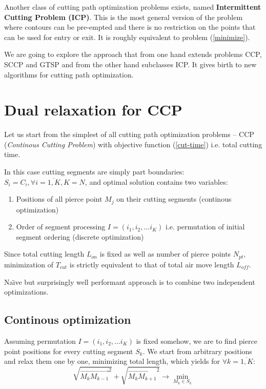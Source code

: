\documentclass{../download/tPRS2e}
\begin{document}
Another class of cutting path optimization problems exists,
named \textbf{Intermittent Cutting Problem (ICP)}.
This is the most general version of the problem
where contours can be pre-empted and there is
no restriction on the points that can be used for entry or exit.
It is roughly equivalent to problem (\ref{minimize}).

We are going to explore the approach
that from one hand
extends problems CCP, SCCP and GTSP
and from the other hand
subclasses ICP.
It gives birth to new algorithms for
cutting path optimization.

\hrulefill

\section{Dual relaxation for CCP}

Let us start from the simplest
of all cutting path optimization problems --
CCP (\textit{Continous Cutting Problem})
with objective function (\ref{cut-time})
i.e. total cutting time. 

In this case
cutting segments are simply part boundaries:
$S_i = C_i, \forall i = \overline{1,K}, K=N$,
and optimal solution contains two variables:
\begin{enumerate}
    \item{Positions of all pierce point $M_j$ on their cutting segments} (continous optimization)
    \item{Order of segment processing $I = (i_1, i_2, \dots i_K)$ i.e. permutation of initial segment ordering} (discrete optimization)
\end{enumerate}
Since total cutting length $L_{on}$
is fixed as well as number of pierce points $N_{pt}$,
minimization of $T_{cut}$
is strictly equivalent to
that of total air move length $L_{off}$.

Na\"{\i}ve but surprisingly well performant approach is to combine
two independent optimizations.

\subsection{Continous optimization}

Assuming permutation 
$I = (i_1, i_2, \dots i_K)$
is fixed somehow,
we are to find pierce point positions for every
cutting segment $S_k$.
We start from arbitrary positions
and relax them one by one,
minimizing total length,
which yields for
$\forall k = \overline{1, K}$:
$$
\sqrt{\overrightarrow{M_k M_{k-1}}^2} +
\sqrt{\overrightarrow{M_k M_{k+1}}^2} \to
\min_{M_k \in S_k}
$$
\end{document}
